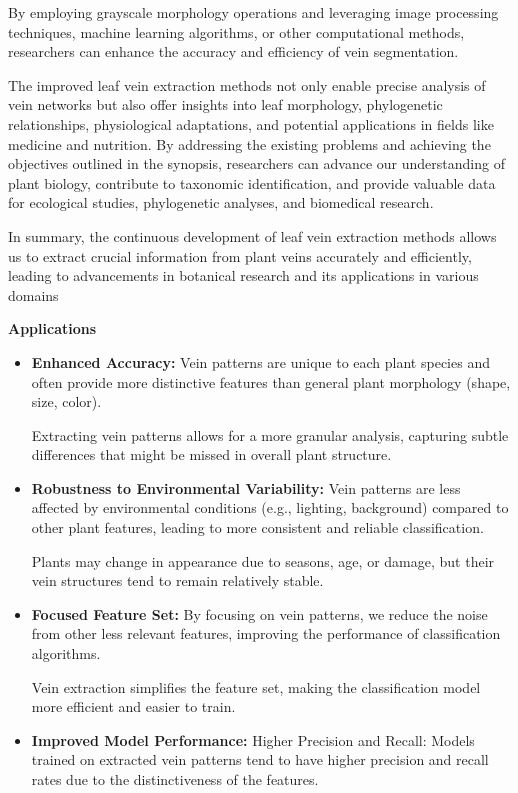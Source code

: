 \documentclass{report}
\begin{document}
{\begin{justify}
By employing grayscale morphology operations and leveraging image
processing techniques, machine learning algorithms, or other computational methods, researchers can enhance the accuracy and efficiency of vein segmentation.

The improved leaf vein extraction methods not only enable precise analysis of vein networks but also offer insights into leaf morphology, phylogenetic relationships, physiological adaptations, and potential applications in fields like medicine and nutrition. By addressing the existing problems and achieving the objectives outlined in the synopsis, researchers can advance
our understanding of plant biology, contribute to taxonomic identification, and provide valuable data for ecological studies, phylogenetic analyses, and biomedical research. 

In summary, the continuous development of leaf vein extraction methods allows us to extract crucial information from plant veins accurately and efficiently, leading to advancements in botanical research and its
applications in various domains
\end{justify}
\vspace{1.5cm}
\centering
\textbf{\Huge Applications}
\begin{itemize}
    \item \textbf{Enhanced Accuracy:} Vein patterns are unique to each plant species and often provide more distinctive features than general plant morphology (shape, size, color).
    
    Extracting vein patterns allows for a more granular analysis, capturing subtle differences that might be missed in overall plant structure.
    \item \textbf{Robustness to Environmental Variability:} Vein patterns are less affected by environmental conditions (e.g., lighting, background) compared to other plant features, leading to more consistent and reliable classification.
    
    Plants may change in appearance due to seasons, age, or damage, but their vein structures tend to remain relatively stable.
    \item \textbf{Focused Feature Set:} By focusing on vein patterns, we reduce the noise from other less relevant features, improving the performance of classification algorithms.
    
    Vein extraction simplifies the feature set, making the classification model more efficient and easier to train.
    \item \textbf{Improved Model Performance:} Higher Precision and Recall: Models trained on extracted vein patterns tend to have higher precision and recall rates due to the distinctiveness of the features.
    

\end{itemize}}
\end{document}
